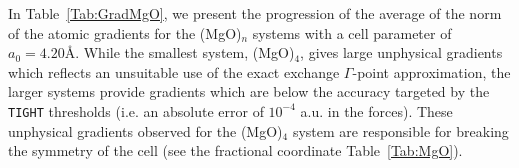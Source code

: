\documentclass[prl,twocolumn,showpacs,twocolumngrid,superbib]{revtex4}
\begin{document}
%
%
%
%
%
%
%
%
%
%
%
%
%
In Table~\ref{Tab:GradMgO}, we present the progression of the average of the norm of the
atomic gradients for the (MgO)$_n$ systems with a cell parameter of $a_0=4.20$\AA. 
While the smallest system, (MgO)$_4$, gives 
large unphysical gradients which reflects 
an unsuitable use of the exact exchange $\Gamma$-point approximation,
the larger systems provide gradients which are below the accuracy targeted by the 
{\tt TIGHT} thresholds (i.e. an absolute error of $10^{-4}$ a.u. in the forces).
These unphysical gradients observed for the (MgO)$_4$ system are responsible for
breaking the symmetry of the cell (see the fractional coordinate Table~\ref{Tab:MgO}).
\end{document}
